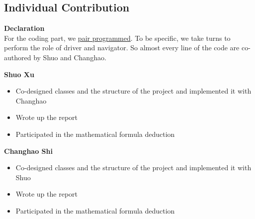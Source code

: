 \documentclass{article} %
\begin{document}
\newpage
\subsection{Individual Contribution}

\textbf{Declaration} \\
For the coding part, we \href{https://en.wikipedia.org/wiki/Pair_programming}{pair programmed}. 
To be specific, we take turns to perform the role of driver and navigator. So almost every line of the code are 
co-authored by Shuo and Changhao.

\textbf{Shuo Xu}
\begin{itemize}
    \item Co-designed classes and the structure of the project and implemented it with Changhao
    \item Wrote up the report
    \item Participated in the mathematical formula deduction
\end{itemize}

\textbf{Changhao Shi}
\begin{itemize}
    \item Co-designed classes and the structure of the project and implemented it with Shuo
    \item Wrote up the report
    \item Participated in the mathematical formula deduction
\end{itemize}
\end{document}
